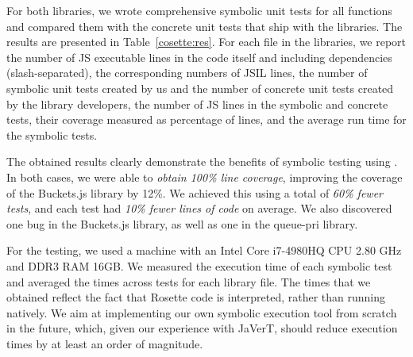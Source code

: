 For both libraries, we wrote comprehensive symbolic unit tests for all functions and compared them with the concrete unit tests that ship with the libraries. The results are presented in Table~\ref{cosette:res}.
For each file in the libraries, we report the number of JS executable lines in the code itself and including dependencies (slash-separated), the corresponding numbers of JSIL lines, the number of symbolic unit tests created by us and the number of concrete unit tests created by the library developers, the number of JS lines in the symbolic and concrete tests, their coverage measured as percentage of lines, and the average \cosette run time for the symbolic tests.

The obtained results clearly demonstrate the benefits of symbolic testing using \cosette.
In both cases, we were able to \emph{obtain 100\% line coverage}, improving the coverage of the Buckets.js library by 12\%.
We achieved this using a total of \emph{60\% fewer tests}, and each test had \emph{10\% fewer lines of code} on average.
We also discovered one bug in the Buckets.js library, as well as one in the queue-pri library. 


For the testing, we used a machine with an Intel Core i7-4980HQ CPU 2.80 GHz and DDR3 RAM 16GB. We measured the execution time of each symbolic test and averaged the times across tests for each library file. The times that we obtained reflect the fact that Rosette code is interpreted, rather than running natively. We aim at implementing our own symbolic execution tool from scratch in the future, which, given our experience with JaVerT, should reduce execution times by at least an order of magnitude.

